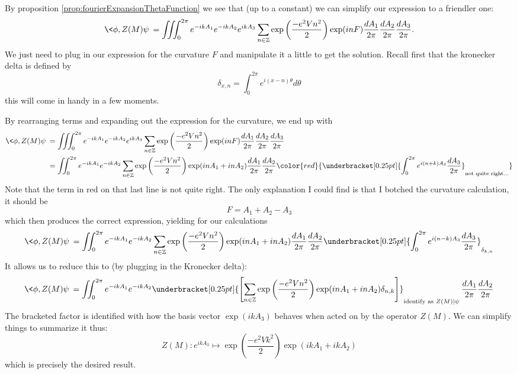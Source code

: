 By proposition \eqref{prop:fourierExpansionThetaFunction} we see
that (up to a constant) we can simplify our expression to a
friendler one:
\begin{equation}%
\<\phi,Z(M)\psi\> = \iiint^{2\pi}_{0}e^{-ikA_{1}}e^{-ikA_{2}}e^{ikA_{3}}\sum_{n\in\mathbb{Z}}\exp\left(\frac{-e^{2}Vn^{2}}{2}\right)\exp(inF)\frac{dA_{1}}{2\pi}\frac{dA_{2}}{2\pi}\frac{dA_{3}}{2\pi}.
\end{equation}
We just need to plug in our expression for the curvature $F$ and
manipulate it a little to get the solution. Recall first that the
kronecker delta is defined by
\begin{equation}%
\delta_{x,n} = \int^{2\pi}_{0} e^{i(x-n)\theta}d\theta
\end{equation}
this will come in handy in a few moments.

By rearranging terms and expanding out the expression for the
curvature, we end up with
\begin{align*}
\<\phi,Z(M)\psi\> &= \iiint^{2\pi}_{0}e^{-ikA_{1}}e^{-ikA_{2}}e^{ikA_{3}}\sum_{n\in\mathbb{Z}}\exp\left(\frac{-e^{2}Vn^{2}}{2}\right)\exp(inF)\frac{dA_{1}}{2\pi}\frac{dA_{2}}{2\pi}\frac{dA_{3}}{2\pi}\\
&=\iint^{2\pi}_{0}e^{-ikA_{1}}e^{-ikA_{2}}\sum_{n\in\mathbb{Z}}\exp\left(\frac{-e^{2}Vn^{2}}{2}\right)\exp(inA_{1}+inA_{2})\frac{dA_{1}}{2\pi}\frac{dA_{2}}{2\pi}\color{red}{\underbracket[0.25pt]{\int^{2\pi}_{0}e^{i(n+k)A_{3}}\frac{dA_{3}}{2\pi}}_{\text{not quite right...}}}
\end{align*}
Note that the term in red on that last line is not quite
right. The only explanation I could find is that I botched the
curvature calculation, it should be
\begin{equation}%
F = A_{1}+A_{2}-A_{3}
\end{equation}
which then produces the correct expression, yielding for our calculations
\begin{equation}%
\<\phi,Z(M)\psi\> = \iint^{2\pi}_{0}e^{-ikA_{1}}e^{-ikA_{2}}\sum_{n\in\mathbb{Z}}\exp\left(\frac{-e^{2}Vn^{2}}{2}\right)\exp(inA_{1}+inA_{2})\frac{dA_{1}}{2\pi}\frac{dA_{2}}{2\pi}\underbracket[0.25pt]{\int^{2\pi}_{0}e^{i(n-k)A_{3}}\frac{dA_{3}}{2\pi}}_{\delta_{k,n}}
\end{equation}
It allows us to reduce this to (by plugging  in the Kronecker
delta):
\begin{equation}%
\<\phi,Z(M)\psi\> =
\iint^{2\pi}_{0}e^{-ikA_{1}}e^{-ikA_{2}}\underbracket[0.25pt]{\left[\sum_{n\in\mathbb{Z}}\exp\left(\frac{-e^{2}Vn^{2}}{2}\right)\exp(inA_{1}+inA_{2})\delta_{n,k}\right]}_{\text{identify as }Z(M)|\psi\>}\frac{dA_{1}}{2\pi}\frac{dA_{2}}{2\pi}
\end{equation}
The bracketed factor is identified with how the basis vector
$\exp(ikA_{3})$ behaves when acted on by the operator $Z(M)$. We
can simplify things to summarize it thus:
\begin{equation}%
Z(M):e^{ikA_{3}}\mapsto \exp\left(\frac{-e^{2}Vk^{2}}{2}\right)\exp(ikA_{1}+ikA_{2})
\end{equation}
which is precisely the desired result.
